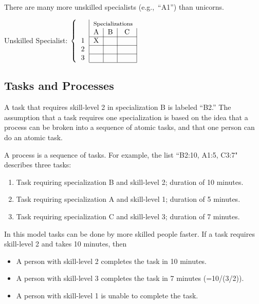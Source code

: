 There are many more unskilled specialists (e.g.,~``A1'') than unicorns.
\begin{center}
Unskilled Specialist:
$\left\{
\begin{tabular}{c|c|c|c|}
& \multicolumn{3}{c}{\footnotesize Specializations}\\
   & A & B & C \\
\cline{2-4}
 1 & X &   &  \\
\cline{2-4}
 2 &   &   & \\
\cline{2-4}
 3 &   &   & \\
\cline{2-4}
\end{tabular}
\right.$
\end{center}

\subsection*{Tasks and Processes}

A task that requires skill-level 2 in specialization B is labeled ``B2.''
The assumption that a task requires one specialization is based on the idea that a process can be broken into a sequence of atomic tasks, and that one person can do an atomic task. 

A process is a sequence of tasks. For example, the list ``B2:10, A1:5, C3:7" describes three tasks: 
\begin{enumerate}
    \item Task requiring specialization B and skill-level 2; duration of 10 minutes.
    \item Task requiring specialization A and skill-level 1; duration of 5 minutes.
    \item Task requiring specialization C and skill-level 3; duration of 7 minutes.    
\end{enumerate}

In this model tasks can be done by more skilled people faster. If a task requires skill-level 2 and takes 10 minutes, then
\begin{itemize}
    \item A person with skill-level 2 completes the task in 10 minutes.
    \item A person with skill-level 3 completes the task in  7 minutes (=10/(3/2)).
    \item A person with skill-level 1 is unable to complete the task.
\end{itemize}

